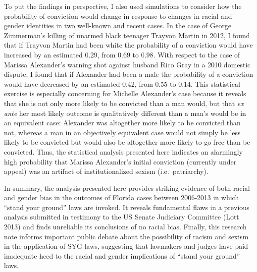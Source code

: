 \documentclass[12pt,article]{article}
\begin{document}
To put the findings in perspective, I also used simulations to consider
how the probability of conviction would change in response to changes in
racial and gender identities in two well-known and recent cases. In the
case of George Zimmerman's killing of unarmed black teenager Trayvon
Martin in 2012, I found that if Trayvon Martin had been white the
probability of a conviction would have increased by an estimated 0.29,
from 0.69 to 0.98. With respect to the case of Marissa Alexander's
warning shot against husband Rico Gray in a 2010 domestic dispute, I
found that if Alexander had been a male the probability of a conviction
would have decreased by an estimated 0.42, from 0.55 to 0.14. This
statistical exercise is especially concerning for Michelle Alexander's
case because it reveals that she is not only more likely to be convicted
than a man would, but that \emph{ex ante} her most likely outcome is
qualitatively different than a man's would be in an equivalent case:
Alexander was altogether more likely to be convicted than not, whereas a
man in an objectively equivalent case would not simply be less likely to
be convicted but would also be altogether more likely to go free than be
convicted. Thus, the statistical analysis presented here indicates an
alarmingly high probability that Marissa Alexander's initial conviction
(currently under appeal) was an artifact of institutionalized sexism
(i.e.~patriarchy).

In summary, the analysis presented here provides striking evidence of
both racial and gender bias in the outcomes of Florida cases between
2006-2013 in which ``stand your ground'' laws are invoked. It reveals
fundamental flaws in a previous analysis submitted in testimony to the
US Senate Judiciary Committee (Lott 2013) and finds unreliable its
conclusions of no racial bias. Finally, this research note informs
important public debate about the possibility of racism and sexism in
the application of SYG laws, suggesting that lawmakers and judges have
paid inadequate heed to the racial and gender implications of ``stand
your ground'' laws.

\pagebreak
\end{document}
